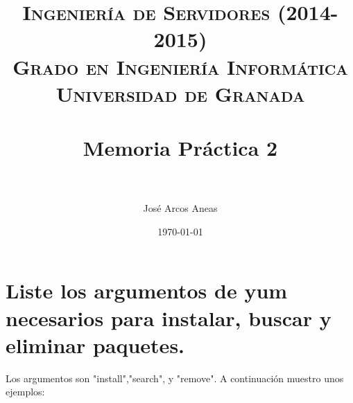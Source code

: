 



\title{	
\normalfont \normalsize 
\textsc{{\bf Ingeniería de Servidores (2014-2015)} \\ Grado en Ingeniería Informática \\ Universidad de Granada} \\ [25pt] %
\horrule{0.5pt} \\[0.4cm] %
\huge Memoria Práctica 2 \\ %
\horrule{2pt} \\[0.5cm] %
}
\author{José Arcos Aneas} %
\date{\normalsize\today} %



\maketitle %
\newpage %
\tableofcontents %
\listoffigures
\newpage


\section{Liste los argumentos de yum necesarios para instalar, buscar y eliminar paquetes.}

Los argumentos son "install","search", y "remove".
A continuación muestro unos ejemplos:


